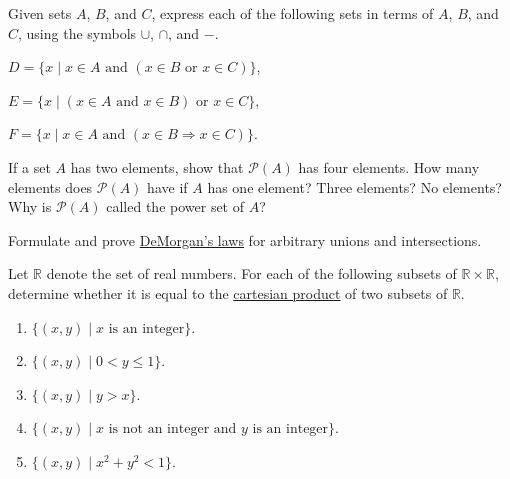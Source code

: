   \begin{exercise}[Munkres 1.7]
    Given sets $A$, $B$, and $C$, express each of the following sets in terms of $A$, $B$, and $C$, using the symbols $\cup$, $\cap$, and $-$.

    $D = \{x \mid x \in A \text{ and } (x \in B \text{ or } x \in C)\}$,

    $E = \{x \mid (x \in A \text{ and } x \in B) \text{ or } x \in C\}$,

    $F = \{x \mid x \in A \text{ and } (x \in B \Rightarrow x \in C)\}$.
  \end{exercise}
  \begin{solution}
    
  \end{solution}

  \begin{exercise}[Munkres 1.8]
    If a set $A$ has two elements, show that $\mathcal{P}(A)$ has four elements. How many elements does $\mathcal{P}(A)$ have if $A$ has one element? Three elements? No elements? Why is $\mathcal{P}(A)$ called the power set of $A$?
  \end{exercise}
  \begin{solution}
    
  \end{solution}

  \begin{exercise}[Munkres 1.9]
    Formulate and prove \hyperref[thm:demorgan]{DeMorgan's laws} for arbitrary unions and intersections.
  \end{exercise}
  \begin{solution}
    
  \end{solution}

  \begin{exercise}[Munkres 1.10]
    Let $\mathbb{R}$ denote the set of real numbers. For each of the following subsets of $\mathbb{R} \times \mathbb{R}$, determine whether it is equal to the \hyperref[def:cart-prod-2]{cartesian product} of two subsets of $\mathbb{R}$.
    \begin{enumerate}
      \item $\{(x, y) \mid x \text{ is an integer}\}$.
      \item $\{(x, y) \mid 0 < y \leq 1\}$.
      \item $\{(x, y) \mid y > x\}$.
      \item $\{(x, y) \mid x \text{ is not an integer and } y \text{ is an integer}\}$.
      \item $\{(x, y) \mid x^2 + y^2 < 1\}$.
    \end{enumerate}
  \end{exercise}
  \begin{solution}
    
  \end{solution}

